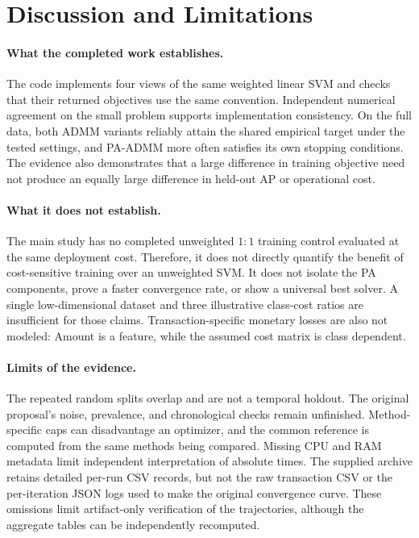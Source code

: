 \documentclass{article}
\begin{document}
\section{Discussion and Limitations}

\paragraph{What the completed work establishes.}
The code implements four views of the same weighted linear SVM and checks that their returned objectives use the same convention. Independent numerical agreement on the small problem supports implementation consistency. On the full data, both ADMM variants reliably attain the shared empirical target under the tested settings, and PA-ADMM more often satisfies its own stopping conditions. The evidence also demonstrates that a large difference in training objective need not produce an equally large difference in held-out AP or operational cost.

\paragraph{What it does not establish.}
The main study has no completed unweighted $1{:}1$ training control evaluated at the same deployment cost. Therefore, it does not directly quantify the benefit of cost-sensitive training over an unweighted SVM. It does not isolate the PA components, prove a faster convergence rate, or show a universal best solver. A single low-dimensional dataset and three illustrative class-cost ratios are insufficient for those claims. Transaction-specific monetary losses are also not modeled: Amount is a feature, while the assumed cost matrix is class dependent.

\paragraph{Limits of the evidence.}
The repeated random splits overlap and are not a temporal holdout. The original proposal's noise, prevalence, and chronological checks remain unfinished. Method-specific caps can disadvantage an optimizer, and the common reference is computed from the same methods being compared. Missing CPU and RAM metadata limit independent interpretation of absolute times. The supplied archive retains detailed per-run CSV records, but not the raw transaction CSV or the per-iteration JSON logs used to make the original convergence curve. These omissions limit artifact-only verification of the trajectories, although the aggregate tables can be independently recomputed.
\end{document}
